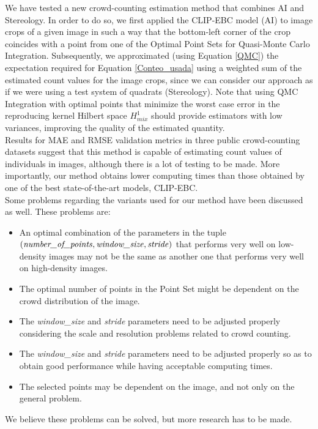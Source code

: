 We have tested a new crowd-counting estimation method that combines AI and Stereology. In order to do so, we first applied the CLIP-EBC model (AI) to image crops of a given image in such a way that the bottom-left corner of the crop coincides with a point from one of the Optimal Point Sets for Quasi-Monte Carlo Integration. Subsequently, we approximated (using Equation \ref{QMC}) the expectation required for Equation \eqref{Conteo_usada} using a weighted sum of the estimated count values for the image crops, since we can consider our approach as if we were using a test system of quadrats (Stereology). Note that using QMC Integration with optimal points that minimize the worst case error in the reproducing
kernel Hilbert space $H^1_{mix}$ should provide estimators with low variances, improving the quality of the estimated quantity.\\

Results for MAE and RMSE validation metrics in three public crowd-counting datasets suggest that this method is capable of estimating count values of individuals in images, although there is a lot of testing to be made. More importantly, our method obtains lower computing times than those obtained by one of the best state-of-the-art models, CLIP-EBC.\\


Some problems regarding the variants used for our method have been discussed as well. These problems are:
\begin{itemize}
    \item An optimal combination of the parameters in the tuple $(\text{\textit{number\_of\_points}},  \text{\textit{window\_size}}, \text{\textit{stride}})$ that performs very well on low-density images may not be the same as another one that performs very well on high-density images.
    \item The optimal number of points in the Point Set might be dependent on the crowd distribution of the image.
    \item The \textit{window\_size} and \textit{stride} parameters need to be adjusted properly considering the scale and resolution problems related to crowd counting.
    \item The \textit{window\_size} and \textit{stride} parameters need to be adjusted properly so as to obtain good performance while having acceptable computing times.
    \item The selected points may be dependent on the image, and not only on the general problem. 
\end{itemize}
We believe these problems can be solved, but more research has to be made.\\

